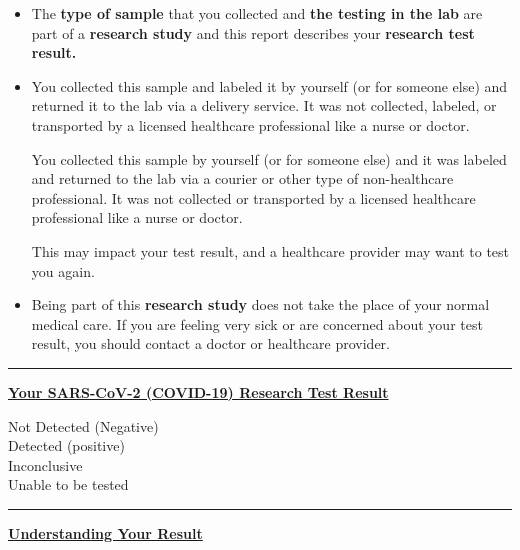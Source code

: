 \documentclass[10pt]{article}
\newcommand{\PageLine}{\rule{\textwidth}{0.25mm}}
\begin{document}
\begin{itemize}
\item

  The \textbf{type of sample} that you collected and \textbf{the testing in the
  lab} are part of a \textbf{research study} and this report describes your
  \textbf{research test result.}

\item
  You collected this sample and labeled it by yourself (or for someone else) and
  returned it to the lab via a delivery service. It was not collected, labeled,
  or transported by a licensed healthcare professional like a nurse or doctor.

  You collected this sample by yourself (or for someone else) and it was labeled
  and returned to the lab via a courier or other type of non-healthcare
  professional. It was not collected or transported by a licensed healthcare
  professional like a nurse or doctor.



  This may impact your test result, and a healthcare provider may want to test
  you again.

\item

  Being part of this \textbf{research study} does not take the place of your
  normal medical care. If you are feeling very sick or are concerned about your
  test result, you should contact a doctor or healthcare provider.

\end{itemize}

\bigskip
\PageLine

\large \underline{\textbf{Your SARS-CoV-2 (COVID-19) Research Test Result}}

Not Detected (Negative)\\
Detected (positive)\\
Inconclusive\\
Unable to be tested\\

\PageLine
\bigskip

\large \underline{\textbf{Understanding Your Result}}
\end{document}
